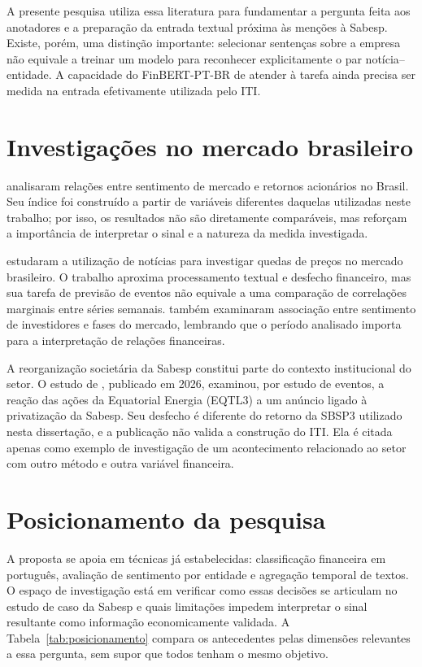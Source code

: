 A presente pesquisa utiliza essa literatura para fundamentar a pergunta feita aos anotadores e a preparação da entrada textual próxima às menções à Sabesp. Existe, porém, uma distinção importante: selecionar sentenças sobre a empresa não equivale a treinar um modelo para reconhecer explicitamente o par notícia--entidade. A capacidade do FinBERT-PT-BR de atender à tarefa ainda precisa ser medida na entrada efetivamente utilizada pelo ITI.

\section{Investigações no mercado brasileiro}

 analisaram relações entre sentimento de mercado e retornos acionários no Brasil. Seu índice foi construído a partir de variáveis diferentes daquelas utilizadas neste trabalho; por isso, os resultados não são diretamente comparáveis, mas reforçam a importância de interpretar o sinal e a natureza da medida investigada.

 estudaram a utilização de notícias para investigar quedas de preços no mercado brasileiro. O trabalho aproxima processamento textual e desfecho financeiro, mas sua tarefa de previsão de eventos não equivale a uma comparação de correlações marginais entre séries semanais.  também examinaram associação entre sentimento de investidores e fases do mercado, lembrando que o período analisado importa para a interpretação de relações financeiras.

A reorganização societária da Sabesp constitui parte do contexto institucional do setor. O estudo de , publicado em 2026, examinou, por estudo de eventos, a reação das ações da Equatorial Energia (EQTL3) a um anúncio ligado à privatização da Sabesp. Seu desfecho é diferente do retorno da SBSP3 utilizado nesta dissertação, e a publicação não valida a construção do ITI. Ela é citada apenas como exemplo de investigação de um acontecimento relacionado ao setor com outro método e outra variável financeira.


\section{Posicionamento da pesquisa}

A proposta se apoia em técnicas já estabelecidas: classificação financeira em português, avaliação de sentimento por entidade e agregação temporal de textos. O espaço de investigação está em verificar como essas decisões se articulam no estudo de caso da Sabesp e quais limitações impedem interpretar o sinal resultante como informação economicamente validada. A Tabela~\ref{tab:posicionamento} compara os antecedentes pelas dimensões relevantes a essa pergunta, sem supor que todos tenham o mesmo objetivo.

